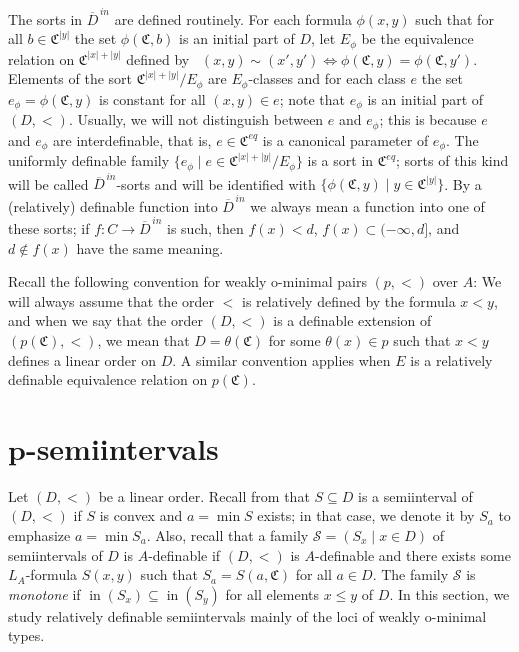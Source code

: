 \documentclass{amsart}
\theoremstyle{definition}
\theoremstyle{definition}
\newcommand{\Mon}{\mathfrak C}
\newcommand{\Moneq}{\mathfrak C^{eq}}
\DeclareMathOperator{\supin}{in}
\begin{document}
The sorts in $\overline D^{\,in}$ are defined routinely. For each formula $\phi(x,y)$ such that for all $b\in \Mon^{|y|}$ the set $\phi(\Mon,b)$ is an initial part of $D$, let $E_{\phi}$ be the equivalence relation on $\Mon^{|x|+|y|}$ defined by \ $(x,y)\sim (x',y')\Leftrightarrow \phi(\Mon,y)=\phi(\Mon,y')$. Elements of the sort $\Mon^{|x|+|y|}/E_{\phi}$ are $E_{\phi}$-classes and for each class $e$ the set $e_\phi=\phi(\Mon,y)$ is constant for all $(x,y)\in e$; note that $e_\phi$ is an initial part of $(D,<)$. Usually, we will not distinguish between $e$ and $e_\phi$; this is because $e$ and $e_{\phi}$ are interdefinable, that is, $e\in \Moneq$ is a canonical parameter of $e_{\phi}$. The uniformly definable family
$\{e_{\phi}\mid e\in\Mon^{|x|+|y|}/E_{\phi}\}$ is a sort in $\Moneq$; sorts of this kind will be called $\overline D^{\,in}$-sorts and will be identified with $\{\phi(\Mon, y)\mid y\in \Mon^{|y|}\}$. By a (relatively) definable function into $\overline D^{\,in}$ we always mean a function into one of these sorts;
if $f:C\to \overline D^{\,in}$ is such, then $f(x)<d$, $f(x)\subset (-\infty, d]$, and $d\notin f(x)$ have the same meaning. 


 
    
\smallskip 

Recall the following convention for weakly o-minimal pairs $(p,<)$ over $A$: We will always assume that the order $<$ is relatively defined by the formula $x<y$, and when we say that the order $(D,<)$ is a definable extension of $(p(\Mon),<)$, we mean that $D=\theta(\Mon)$ for some $\theta(x)\in p$ such that $x<y$ defines a linear order on $D$. A similar convention applies when $E$ is a relatively definable equivalence relation on $p(\Mon)$.



 
\section{$\mathbf p$-semiintervals}\label{Section 2}

Let $(D,<)$ be a linear order. 
Recall from \cite[Section 6]{MTwqom1} that $S\subseteq D$ is a semiinterval of $(D,<)$ if $S$ is convex and $a=\min S$ exists; in that case, we denote it by $S_a$ to emphasize $a=\min S_a$. Also, recall that a family $\mathcal S=(S_x\mid x\in D)$ of semiintervals of $D$ is $A$-definable if $(D,<)$ is $A$-definable and there exists some $L_A$-formula $S(x,y)$ such that $S_a=S(a,\Mon)$ for all $a\in D$.
The family $\mathcal S$ is {\it monotone} if $\supin (S_x)\subseteq\supin (S_y)$ for all elements $x\leqslant y$ of $D$. In this section, we study relatively definable semiintervals mainly of the loci of weakly o-minimal types. 
\end{document}
